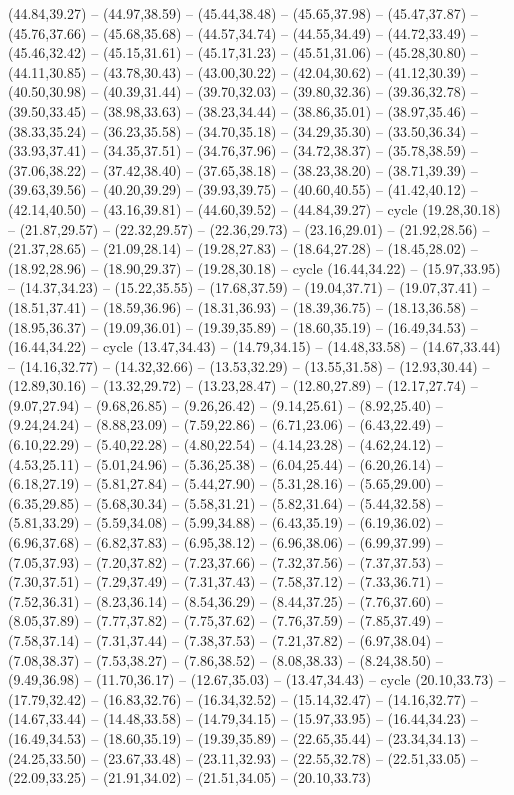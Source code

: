 {(44.84,39.27) -- (44.97,38.59) -- (45.44,38.48) -- (45.65,37.98) -- (45.47,37.87) -- (45.76,37.66) -- (45.68,35.68) -- (44.57,34.74) -- (44.55,34.49) -- (44.72,33.49) -- (45.46,32.42) -- (45.15,31.61) -- (45.17,31.23) -- (45.51,31.06) -- (45.28,30.80) -- (44.11,30.85) -- (43.78,30.43) -- (43.00,30.22) -- (42.04,30.62) -- (41.12,30.39) -- (40.50,30.98) -- (40.39,31.44) -- (39.70,32.03) -- (39.80,32.36) -- (39.36,32.78) -- (39.50,33.45) -- (38.98,33.63) -- (38.23,34.44) -- (38.86,35.01) -- (38.97,35.46) -- (38.33,35.24) -- (36.23,35.58) -- (34.70,35.18) -- (34.29,35.30) -- (33.50,36.34) -- (33.93,37.41) -- (34.35,37.51) -- (34.76,37.96) -- (34.72,38.37) -- (35.78,38.59) -- (37.06,38.22) -- (37.42,38.40) -- (37.65,38.18) -- (38.23,38.20) -- (38.71,39.39) -- (39.63,39.56) -- (40.20,39.29) -- (39.93,39.75) -- (40.60,40.55) -- (41.42,40.12) -- (42.14,40.50) -- (43.16,39.81) -- (44.60,39.52) -- (44.84,39.27) -- cycle (19.28,30.18) -- (21.87,29.57) -- (22.32,29.57) -- (22.36,29.73) -- (23.16,29.01) -- (21.92,28.56) -- (21.37,28.65) -- (21.09,28.14) -- (19.28,27.83) -- (18.64,27.28) -- (18.45,28.02) -- (18.92,28.96) -- (18.90,29.37) -- (19.28,30.18) -- cycle (16.44,34.22) -- (15.97,33.95) -- (14.37,34.23) -- (15.22,35.55) -- (17.68,37.59) -- (19.04,37.71) -- (19.07,37.41) -- (18.51,37.41) -- (18.59,36.96) -- (18.31,36.93) -- (18.39,36.75) -- (18.13,36.58) -- (18.95,36.37) -- (19.09,36.01) -- (19.39,35.89) -- (18.60,35.19) -- (16.49,34.53) -- (16.44,34.22) -- cycle (13.47,34.43) -- (14.79,34.15) -- (14.48,33.58) -- (14.67,33.44) -- (14.16,32.77) -- (14.32,32.66) -- (13.53,32.29) -- (13.55,31.58) -- (12.93,30.44) -- (12.89,30.16) -- (13.32,29.72) -- (13.23,28.47) -- (12.80,27.89) -- (12.17,27.74) -- (9.07,27.94) -- (9.68,26.85) -- (9.26,26.42) -- (9.14,25.61) -- (8.92,25.40) -- (9.24,24.24) -- (8.88,23.09) -- (7.59,22.86) -- (6.71,23.06) -- (6.43,22.49) -- (6.10,22.29) -- (5.40,22.28) -- (4.80,22.54) -- (4.14,23.28) -- (4.62,24.12) -- (4.53,25.11) -- (5.01,24.96) -- (5.36,25.38) -- (6.04,25.44) -- (6.20,26.14) -- (6.18,27.19) -- (5.81,27.84) -- (5.44,27.90) -- (5.31,28.16) -- (5.65,29.00) -- (6.35,29.85) -- (5.68,30.34) -- (5.58,31.21) -- (5.82,31.64) -- (5.44,32.58) -- (5.81,33.29) -- (5.59,34.08) -- (5.99,34.88) -- (6.43,35.19) -- (6.19,36.02) -- (6.96,37.68) -- (6.82,37.83) -- (6.95,38.12) -- (6.96,38.06) -- (6.99,37.99) -- (7.05,37.93) -- (7.20,37.82) -- (7.23,37.66) -- (7.32,37.56) -- (7.37,37.53) -- (7.30,37.51) -- (7.29,37.49) -- (7.31,37.43) -- (7.58,37.12) -- (7.33,36.71) -- (7.52,36.31) -- (8.23,36.14) -- (8.54,36.29) -- (8.44,37.25) -- (7.76,37.60) -- (8.05,37.89) -- (7.77,37.82) -- (7.75,37.62) -- (7.76,37.59) -- (7.85,37.49) -- (7.58,37.14) -- (7.31,37.44) -- (7.38,37.53) -- (7.21,37.82) -- (6.97,38.04) -- (7.08,38.37) -- (7.53,38.27) -- (7.86,38.52) -- (8.08,38.33) -- (8.24,38.50) -- (9.49,36.98) -- (11.70,36.17) -- (12.67,35.03) -- (13.47,34.43) -- cycle (20.10,33.73) -- (17.79,32.42) -- (16.83,32.76) -- (16.34,32.52) -- (15.14,32.47) -- (14.16,32.77) -- (14.67,33.44) -- (14.48,33.58) -- (14.79,34.15) -- (15.97,33.95) -- (16.44,34.23) -- (16.49,34.53) -- (18.60,35.19) -- (19.39,35.89) -- (22.65,35.44) -- (23.34,34.13) -- (24.25,33.50) -- (23.67,33.48) -- (23.11,32.93) -- (22.55,32.78) -- (22.51,33.05) -- (22.09,33.25) -- (21.91,34.02) -- (21.51,34.05) -- (20.10,33.73) }
